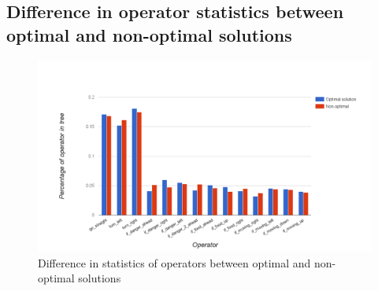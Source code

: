 \documentclass[british,10pt,a4paper]{article}
\begin{document}


\clearpage
\begin{appendices}
	\section{Difference in operator statistics between optimal and non-optimal solutions}
	\label{app:operator_prob}
	\begin{figure}[H]
		\centering
		\includegraphics[width=\textwidth,keepaspectratio]{images/operator_prob.png}
		\caption{Difference in statistics of operators between optimal and non-optimal solutions}
		
	\end{figure}
	\clearpage

\end{appendices}
\end{document}
